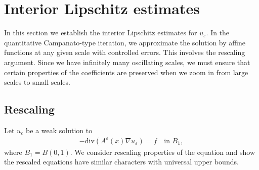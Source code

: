 \documentclass[reqno,12pt]{amsart} %
\theoremstyle{definition}
\theoremstyle{remark}
\numberwithin{equation}{section}
\begin{document}
\section{Interior Lipschitz estimates}\label{sec_interior-lip}

In this section we establish the interior Lipschitz estimates for $u_\varepsilon$. In the quantitative Campanato-type iteration, we approximate the solution by affine functions at any given scale with controlled errors. This involves the rescaling argument. Since we have infinitely many oscillating scales, we must ensure that certain properties of the coefficients are preserved when we zoom in from large scales to small scales.

\subsection{Rescaling}\label{sec_rescaling}
Let $u_\varepsilon$ be a weak solution to
\begin{align}\label{eq.inB1}
  -\mathrm{div}(A^\varepsilon(x)\nabla u_\varepsilon)=f\quad \text{in }B_1,
\end{align}
where $B_1=B(0, 1)$. We consider rescaling properties of the equation and show the rescaled equations have similar characters with universal upper bounds. 
\end{document}

